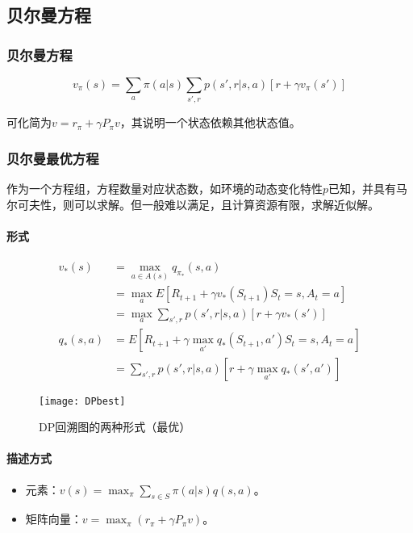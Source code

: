 \documentclass[
12pt, %
a4paper, 
oneside, %
headinclude,footinclude, %
]{scrartcl}
\begin{document}
\subsection{贝尔曼方程}
\subsubsection{贝尔曼方程}
$$
v_\pi(s) = \sum_a \pi(a|s) \sum_{s', r} p(s', r|s, a) [r + \gamma v_\pi(s')]
$$

可化简为$ v = r_\pi + \gamma P_\pi v $，其说明一个状态依赖其他状态值。
\subsubsection{贝尔曼最优方程}
作为一个方程组，方程数量对应状态数，如环境的动态变化特性$ p $已知，并具有马尔可夫性，则可以求解。但一般难以满足，且计算资源有限，求解近似解。
\paragraph{形式}
\begin{align*}
v_*(s) 
&= \max_{a \in A(s)} q_{\pi_*}(s, a) \\
&= \max_a E[R_{t + 1} + \gamma v_*(S_{t + 1})  S_t = s, A_t = a] \\
&= \max_a \sum_{s', r} p(s', r|s, a)[r + \gamma v_*(s')] \\
q_*(s, a) 
&= E[R_{t + 1} + \gamma \max_{a'} q_*(S_{t + 1}, a')  S_t = s, A_t = a] \\
&= \sum_{s', r} p(s', r|s, a)[r + \gamma \max_{a'} q_*(s', a')]
\end{align*}

\begin{figure}[H]
\centering 
\texttt{[image: DPbest]} 
\caption[DP回溯图的两种形式（最优）]{DP回溯图的两种形式（最优）}
\end{figure}
\paragraph{描述方式}
\begin{itemize}
\item 元素：$ v(s) = \max_{\pi} \sum_{s \in S}\pi(a|s)q(s,a) $。
\item 矩阵向量：$ v = \max_{\pi} (r_\pi + \gamma P_\pi v) $。
\end{itemize}
\end{document}
